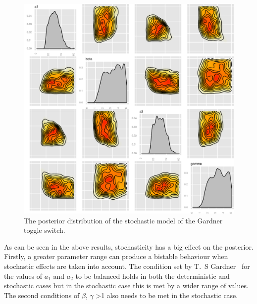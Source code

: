 \begin{figure}[p]
\centering
\includegraphics[scale=0.5]{chapterModelling/images/Gardner/wide_var/posterior_stch_high_mean.pdf}
\caption{The posterior distribution of the stochastic model of the Gardner toggle switch.}
\label{fig:Gard_post_stch}
\end{figure}
\clearpage
As can be seen in the above results, stochasticity has a big effect on the posterior. Firstly, a greater parameter range can produce a bistable behaviour when stochastic effects are taken into account. The condition set by T.~S Gardner~\autocite{Gardner:2000vha} for the values of $a_1$ and $a_2$ to be balanced holds in both the deterministic and stochastic cases but in the stochastic case this is met by a wider range of values. The second conditions of $\beta$, $\gamma$ \textgreater 1 also needs to be met in the stochastic case. 

